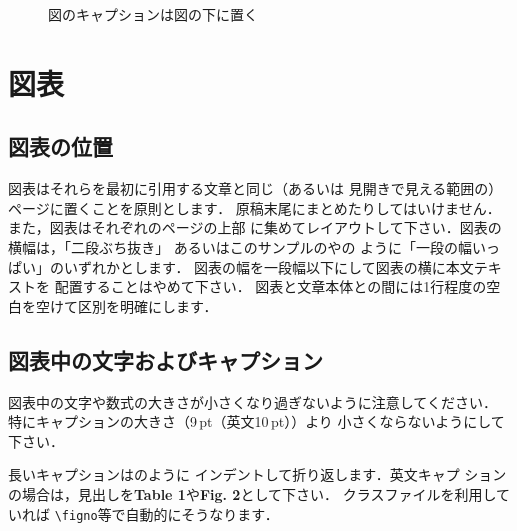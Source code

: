 \documentclass{jsce}
\begin{document}
\begin{figure}
\begin{center}

\end{center}
\vspace*{-4mm}
\caption{図のキャプションは図の下に置く}\label{fig:1}
\end{figure}

\section{図表}

\subsection{図表の位置}

図表はそれらを最初に引用する文章と同じ（あるいは
見開きで見える範囲の）ページに置くことを原則とします．
原稿末尾にまとめたりしてはいけません．
また，図表はそれぞれのページの上部
に集めてレイアウトして下さい．図表の横幅は，「二段ぶち抜き」
あるいはこのサンプルの\tabno{\ref{tab:1}}や\figno{\ref{fig:1}}の
ように「一段の幅いっぱい」のいずれかとします．
図表の幅を一段幅以下にして図表の横に本文テキストを
配置することはやめて下さい．
図表と文章本体との間には1行程度の空白を空けて区別を明確にします．

\subsection{図表中の文字およびキャプション}

図表中の文字や数式の大きさが小さくなり過ぎないように注意してください．
特にキャプションの大きさ（9\,pt（英文10\,pt））より
小さくならないようにして下さい．

長いキャプションは\tabno{\ref{tab:1}}のように
インデントして折り返します．英文キャプ
ションの場合は，見出しを{\bf Table 1}や{\bf Fig. 2}として下さい．
クラスファイルを利用していれば \verb+\figno+等で自動的にそうなります．


\onecolumn
\landscape
\thispagestyle{empty}
\end{document}
